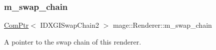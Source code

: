 \subsubsection{\texorpdfstring{m\+\_\+swap\+\_\+chain}{m\_swap\_chain}}
{\footnotesize\ttfamily \hyperlink{namespacemage_ae74f374780900893caa5555d1031fd79}{Com\+Ptr}$<$ I\+D\+X\+G\+I\+Swap\+Chain2 $>$ mage\+::\+Renderer\+::m\+\_\+swap\+\_\+chain\hspace{0.3cm}{\ttfamily [private]}}

A pointer to the swap chain of this renderer. 